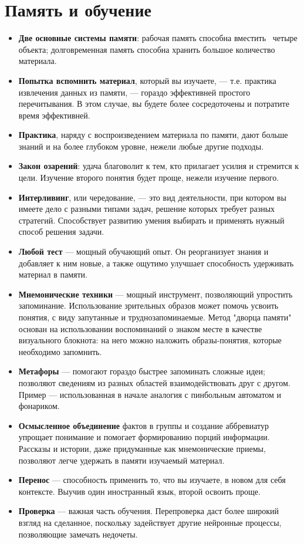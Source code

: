 \documentclass{article}
\begin{document}
\section{Память и обучение}
\begin{itemize}
\item \textbf{Две основные системы памяти}: рабочая память способна вместить ~четыре объекта; долговременная память способна хранить большое количество материала.
\item \textbf{Попытка вспомнить материал}, который вы изучаете, --- т.е. практика извлечения данных из памяти, --- гораздо эффективней простого перечитывания. В этом случае, вы будете более сосредоточены и потратите время эффективней.
\item \textbf{Практика}, наряду с воспроизведением материала по памяти, дают больше знаний и на более глубоком уровне, нежели любые другие подходы.
\item \textbf{Закон озарений}: удача благоволит к тем, кто прилагает усилия и стремится к цели. Изучение второго понятия будет проще, нежели изучение первого.
\item \textbf{Интерливинг}, или чередование, --- это вид деятельности, при котором вы имеете дело с разными типами задач, решение которых требует разных стратегий. Способствует развитию умения выбирать и применять нужный способ решения задачи.
\item \textbf{Любой тест} --- мощный обучающий опыт. Он реорганизует знания и добавляет к ним новые, а также ощутимо улучшает способность удерживать материал в памяти. 
\item \textbf{Мнемонические техники} --- мощный инструмент, позволяющий упростить запоминание. Использование зрительных образов может помочь усвоить понятия, с виду запутанные и труднозапоминаемые. Метод "дворца памяти" основан на использовании воспоминаний о знаком месте в качестве визуального блокнота: на него можно наложить образы-понятия, которые необходимо запомнить. 
\item \textbf{Метафоры} --- помогают гораздо быстрее запоминать сложные идеи; позволяют сведениям из разных областей взаимодействовать друг с другом.	 Пример --- использованная в начале аналогия с пинбольным автоматом и фонариком.
\item \textbf{Осмысленное объединение} фактов в группы и создание аббревиатур упрощает понимание и помогает формированию порций информации. Рассказы и истории, даже придуманные как мнемонические приемы, позволяют легче удержать в памяти изучаемый материал.
\item \textbf{Перенос} --- способность применить то, что вы изучаете, в новом для себя контексте. Выучив один иностранный язык, второй освоить проще.
\item \textbf{Проверка} --- важная часть обучения. Перепроверка даст более широкий взгляд на сделанное, поскольку задействует другие нейронные процессы, позволяющие замечать недочеты.
\end{itemize}
\end{document}
